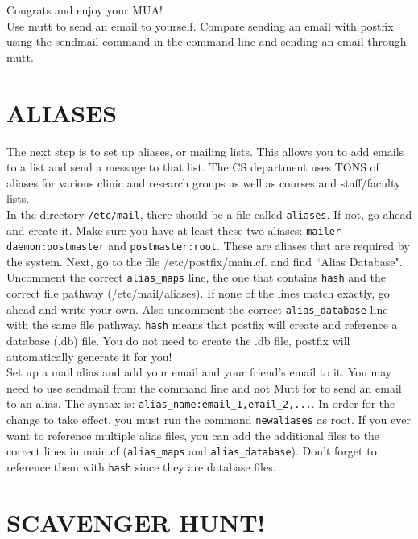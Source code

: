 \documentclass{article}
\begin{document}
Congrats and enjoy your MUA! \\

Use mutt to send an email to yourself. Compare sending an email with postfix using the sendmail command in the command line and sending an email through mutt.



\section*{ALIASES}

\indent\indent The next step is to set up aliases, or mailing lists. This allows you to add emails to a list and send a message to that list. The CS department uses TONS of aliases for various clinic and research groups as well as courses and staff/faculty lists. \\

In the directory \verb|/etc/mail|, there should be a file called \verb|aliases|. If not, go ahead and create it. Make sure you have at least these two aliases: \verb|mailer-daemon:postmaster| and \verb|postmaster:root|. These are aliases that are required by the system. Next, go to the file /etc/postfix/main.cf. and find ``Alias Database". Uncomment the correct \verb|alias_maps| line, the one that contains \verb|hash| and the correct file pathway (/etc/mail/aliases). If none of the lines match exactly, go ahead and write your own. Also uncomment the correct \verb|alias_database| line with the same file pathway. \verb|hash| means that postfix will create and reference a database (.db) file. You do not need to create the .db file, postfix will automatically generate it for you! \\

Set up a mail alias and add your email and your friend's email to it. You may need to use sendmail from the command line and not Mutt for to send an email to an alias. The syntax is: \verb|alias_name:email_1,email_2,...|. In order for the change to take effect, you must run the command \verb|newaliases| as root. If you ever want to reference multiple alias files, you can add the additional files to the correct lines in main.cf (\verb|alias_maps| and \verb|alias_database|). Don't forget to reference them with \verb|hash| since they are database files.



\section*{SCAVENGER HUNT!}
\end{document}
